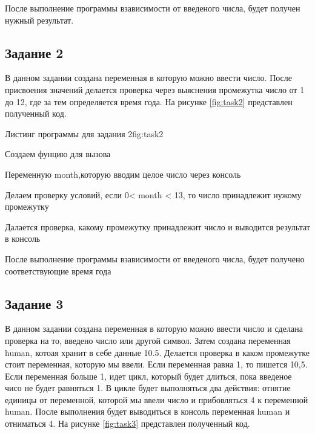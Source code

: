 \documentclass{vvsu}
\begin{document}
После выполнение программы взависимости от введеного числа, будет получен нужный результат.



\subsection{Задание 2}
В данном задании создана переменная в которую можно ввести число. После присвоения значений делается проверка через выяснения промежутка число от 1 до 12, где за тем определяется время года. На рисунке \ref{fig:task2} представлен полученный код.

\begin{vvsu_figure}{Листинг программы для задания 2}{fig:task2}
    \begin{minipage}{.75\textwidth}
        
    \end{minipage}
\end{vvsu_figure}

\begin{vvsu_list}
    \item Создаем фунцию для вызова
    \item Переменную month,которую вводим целое число через консоль
    \item Делаем проверку условий, если 0< month < 13, то число принадлежит нужому промежутку
    \item Далается проверка, какому промежутку принадлежит число и выводится результат в консоль
\end{vvsu_list}
После выполнение программы взависимости от введеного числа, будет получено соответствующие время года

\subsection{Задание 3}
В данном задании создана переменная в которую можно ввести число и сделана проверка на то, введено число или другой символ. Затем создана переменная human, котоая хранит в себе данные 10.5. Делается проверка в каком промежутке стоит переменная, которую мы ввели. Если переменная равна 1, то пишется 10,5. Если переменная больше 1, идет цикл, который будет длиться, пока введеное чисо не будет равняться 1. В цикле будет выполняться два действия: отнятие единицы от переменной, которой мы ввели число и прибовляться 4 к переменной human. После выполнения будет выводиться в консоль переменная human и отниматься 4. На рисунке \ref{fig:task3} представлен полученный код.
\end{document}
